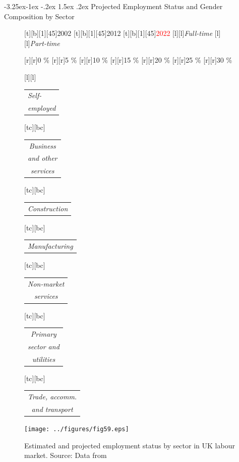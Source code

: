 \documentclass[11 pt, a4paper]{report}
\makeatletter
\renewcommand{\arraystretch}{1.2}
\renewcommand\subsection{\@startsection{subsection}{2}{\z@}%
                                     {-3.25ex\@plus -1ex \@minus -.2ex}%
                                     {1.5ex \@plus .2ex}%
    								{\large\scshape}}
\makeatother
\begin{document}
\clearpage 

\subsection{Projected Employment Status and Gender Composition by Sector}



\begin{figure}[hbtp!]
[t][b][1][45]{\small{2002}}
[t][b][1][45]{\small{2012}}
[t][b][1][45]{\small{\textcolor{red}{2022}}}
[l][l]{\scriptsize{\emph{Full-time}}}
[l][l]{\scriptsize{\emph{Part-time}}}


[r][r]{\scriptsize{0 \%}}
[r][r]{\scriptsize{5 \%}}
[r][r]{\scriptsize{10 \%}}
[r][r]{\scriptsize{15 \%}}
[r][r]{\scriptsize{20 \%}}
[r][r]{\scriptsize{25 \%}}
[r][r]{\scriptsize{30 \%}}

\renewcommand{\arraystretch}{0.7}
[l][l]{\scriptsize{
\begin{tabular}{@{}l}
\emph{Self-}\\
\emph{employed}
\end{tabular}}}

[tc][bc]{\scriptsize{
\begin{tabular}{c}
\emph{Business}\\
\emph{and other }\\
\emph{services}
\end{tabular}
}}
[tc][bc]{\scriptsize{
\begin{tabular}{c}
\emph{Construction}
\end{tabular}
}}
[tc][bc]{\scriptsize{
\begin{tabular}{c}
\emph{Manufacturing}
\end{tabular}
}}

[tc][bc]{\scriptsize{
\begin{tabular}{c}
\emph{Non-market}\\
\emph{services}
\end{tabular}
}}
[tc][bc]{\scriptsize{
\begin{tabular}{c}
\emph{Primary }\\
\emph{sector and }\\
\emph{utilities}
\end{tabular}
}}
[tc][bc]{\scriptsize{
\begin{tabular}{c}
\emph{Trade, accomm.}\\
\emph{and transport}
\end{tabular}
}}
\centering
\texttt{[image: ../figures/fig59.eps]}
\caption{Estimated and projected employment status by sector in UK labour market. Source: Data from \citet{Wilson2014} }\label{Fig:59}
\end{figure}
\end{document}
